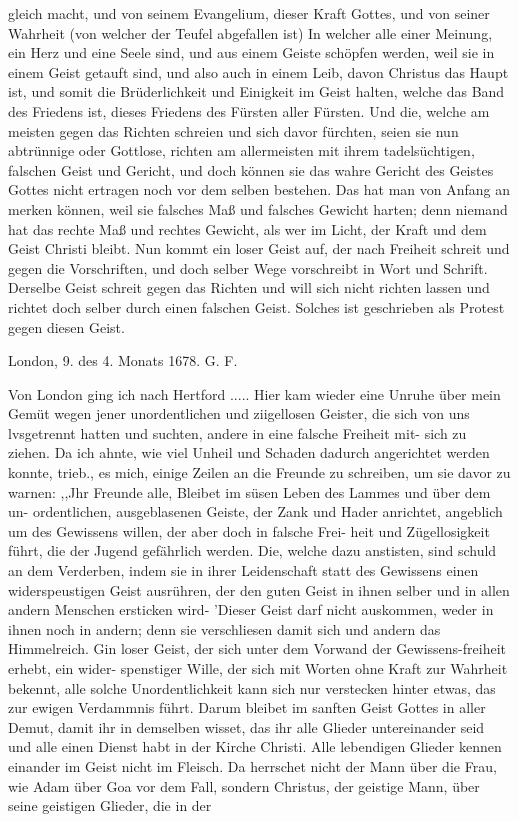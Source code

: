{gleich macht, und von seinem Evangelium, dieser Kraft Gottes,
und von seiner Wahrheit (von welcher der Teufel abgefallen ist)
In welcher alle einer Meinung, ein Herz und eine Seele sind, und
aus einem Geiste schöpfen werden, weil sie in einem Geist
getauft sind, und also auch in einem Leib, davon Christus das
Haupt ist, und somit die Brüderlichkeit und Einigkeit im Geist
halten, welche das Band des Friedens ist, dieses Friedens des
Fürsten aller Fürsten. Und die, welche am meisten gegen das
Richten schreien und sich davor fürchten, seien sie nun abtrünnige
 oder Gottlose, richten am allermeisten mit ihrem
tadelsüchtigen, falschen Geist und Gericht, 
und doch können sie das
wahre Gericht des Geistes Gottes nicht ertragen noch vor dem
selben bestehen. Das hat man von Anfang an merken können,
weil sie falsches Maß und falsches Gewicht harten; denn niemand
hat das rechte Maß und rechtes Gewicht, als wer im Licht,
der Kraft und dem Geist Christi bleibt. Nun kommt ein loser
Geist auf, der nach Freiheit schreit und gegen die Vorschriften,
und doch selber Wege vorschreibt in Wort und Schrift. Derselbe
Geist schreit gegen das Richten und will sich nicht richten lassen
und richtet doch selber durch einen falschen Geist. Solches ist
geschrieben als Protest gegen diesen Geist.

\bigskip 
\begin{flushright}
London, 9. des 4. Monats 1678. G. F.\end{flushright}
}

Von London ging ich nach Hertford ..... Hier kam wieder
eine Unruhe über mein Gemüt wegen jener unordentlichen und
ziigellosen Geister, die sich von uns lvsgetrennt hatten und suchten,
andere in eine falsche Freiheit mit- sich zu ziehen. Da ich ahnte,
wie viel Unheil und Schaden dadurch angerichtet werden konnte,
trieb., es mich, einige Zeilen an die Freunde zu schreiben, um sie
davor zu warnen:
,,Jhr Freunde alle,
Bleibet im süsen Leben des Lammes und über dem un-
ordentlichen, ausgeblasenen Geiste, der Zank und Hader anrichtet,
angeblich um des Gewissens willen, der aber doch in falsche Frei-
heit und Zügellosigkeit führt, die der Jugend gefährlich werden.
Die, welche dazu anstisten, sind schuld an dem Verderben, indem
sie in ihrer Leidenschaft statt des Gewissens einen widerspeustigen
Geist ausrühren, der den guten Geist in ihnen selber und in
allen andern Menschen ersticken wird- ’Dieser Geist darf nicht
auskommen, weder in ihnen noch in andern; denn sie verschliesen
damit sich und andern das Himmelreich. Gin loser Geist, der
sich unter dem Vorwand der Gewissens-freiheit erhebt, ein wider-
spenstiger Wille, der sich mit Worten ohne Kraft zur Wahrheit
bekennt, alle solche Unordentlichkeit kann sich nur verstecken hinter
etwas, das zur ewigen Verdammnis führt. Darum bleibet
im sanften Geist Gottes in aller Demut, damit ihr in demselben
wisset, das ihr alle Glieder untereinander seid und alle einen
Dienst habt in der Kirche Christi. Alle lebendigen Glieder kennen
einander im Geist nicht im Fleisch. Da herrschet nicht der Mann
über die Frau, wie Adam über Goa vor dem Fall, sondern Christus,
der geistige Mann, über seine geistigen Glieder, die in der



